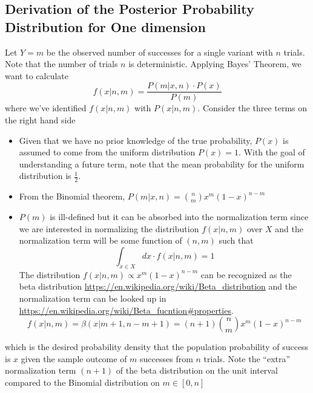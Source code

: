 \documentclass[12pt]{report}
\newcommand{\beq}{\begin{equation}} %
\newcommand{\eeq}{\end{equation}} %
\newcommand{\bdm}{\begin{displaymath}} %
\newcommand{\edm}{\end{displaymath}} %
\newcommand{\bi}{\begin{itemize}} %
\newcommand{\ei}{\end{itemize}} %
\begin{document}
\subsection{Derivation of the Posterior Probability Distribution for One dimension}
Let \(Y = m\) be the observed number of successes for a single variant with
\(n\) trials. Note that the number of trials
\(n\) is deterministic. Applying Bayes' Theorem, we want to calculate
\beq\label{eq:bayesapplied}
f(x|n,m) = \frac{P(m|x,n)\cdot P(x)}{P(m)}
\eeq
where we've identified \(f(x|n,m)\) with \(P(x|n,m)\).
Consider the three terms on the right hand side
\bi
\item 
Given that we have no prior knowledge of the true probability,
\(P(x)\) is assumed to come from the uniform distribution \(P(x)
=1\). With the goal of understanding a future term, note that the mean
probability for the uniform distribution is \(\frac{1}{2}\).
\item From the Binomial theorem, \(P(m|x, n) ={n \choose m}x^m
  (1-x)^{n-m}\)
\item 
\(P(m)\) is ill-defined but it can be absorbed into the normalization term
since we are
interested in normalizing the distribution \(f(x|n,m)\) over \(X\) and
the normalization term will be some function of \((n,m)\) such that
\bdm
\int_{x\in X}dx \cdot f(x|n,m) = 1
\edm
The distribution \(f(x|n,m)\propto x^m(1-x)^{n-m}\) can be recognized as the
beta distribution
\url{https://en.wikipedia.org/wiki/Beta_distribution} and
the normalization term can be looked up in
\url{https://en.wikipedia.org/wiki/Beta_fucntion#properties}.
\bdm
f(x|n,m) =\beta(x|m+1, n-m+1) = (n+1) {n\choose m}x^m (1-x)^{n-m}
\edm
\ei
which is the desired probability density that the population
probability of success is \(x\) given the sample outcome of \(m\)
successes from \(n\) trials. Note the ``extra'' normalization term \((n+1)\)
of the beta distribution on the unit interval
compared to the Binomial distribution on \(m\in[0,n]\)
\end{document}
